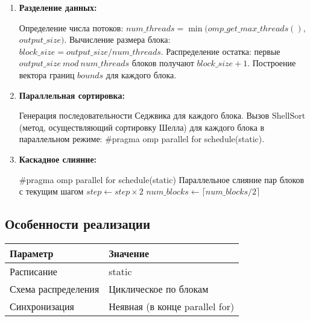 \documentclass[a4paper,14pt]{extarticle}
\begin{document}
\begin{enumerate}[leftmargin=*]
    \item \textbf{Разделение данных:}
    \begin{algorithmic}[1]
        \State Определение числа потоков: $num\_threads = \min(omp\_get\_max\_threads(),$ $ output\_size)$.
        \State Вычисление размера блока: $block\_size = output\_size / num\_threads$.
        \State Распределение остатка: первые $output\_size\ mod\ num\_threads$ блоков получают $block\_size + 1$.
        \State Построение вектора границ $bounds$ для каждого блока.
    \end{algorithmic}

    \item \textbf{Параллельная сортировка:}
    \begin{algorithmic}[1]
        \State Генерация последовательности Седжвика для каждого блока.
        \State Вызов $\text{ShellSort}$ (метод, осуществляющий сортировку Шелла) для каждого блока в параллельном режиме: \#pragma omp parallel for schedule(static).
    \end{algorithmic}

    \item \textbf{Каскадное слияние:}
        \begin{algorithmic}[1]
            \State \#pragma omp parallel for schedule(static)
            \State Параллельное слияние пар блоков с текущим шагом
            \State $step \gets step \times 2$
            \State $num\_blocks \gets \lceil num\_blocks / 2 \rceil$
        \EndWhile
    \end{algorithmic}
\end{enumerate}

\subsection*{Особенности реализации}

\begin{tabular}{|l|l|}
    \hline
    \textbf{Параметр} & \textbf{Значение} \\ \hline
    Расписание & static \\ \hline
    Схема распределения & Циклическое по блокам \\ \hline
    Синхронизация & Неявная (в конце parallel for) \\ \hline
\end{tabular}

\newpage
\end{document}
